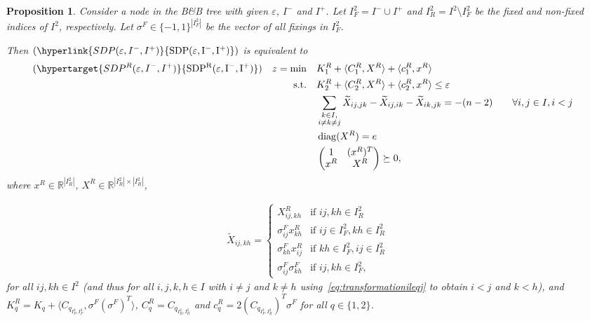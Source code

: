 \documentclass{article}
\newcommand{\mytag}[1]{(\hypertarget{#1}{\mathrm{#1}})}
\newcommand{\myrefmath}[1]{(\hyperlink{#1}{\mathrm{#1}})}
\DeclareMathOperator{\diag}{diag}
\newtheorem{proposition}[theorem]{Proposition}
\begin{document}
\begin{proposition}    \label{prop:red}
Consider a node in the B\&B tree with given $\varepsilon$, $I^-$ and $I^+$.
Let $I^2_F = I^- \cup I^+$ and $I^2_R = I^2\setminus I^2_F$ be the fixed and non-fixed indices of $I^2$, respectively. 
Let $\sigma^F \in \{-1,1\}^{|I^2_F|}$ be the vector of all fixings in $I^2_F$. 

Then $\myrefmath{SDP(\varepsilon,I^-,I^+)}$ is equivalent to 
\begin{subequations}
    \begin{align}
        \mytag{SDP^R(\varepsilon,I^-,I^+)} \quad z = \min \quad &K_1^R +\langle C_1^R,X^R \rangle + \langle c_1^R, x^R \rangle \label{eq:SDPR-obj}\\
        \text{s.t.} \quad & K_2^R + \langle C_2^R, X^R \rangle + \langle c_2^R, x^R \rangle \leq \varepsilon \label{eq:SDPR-eps} \\ 
         & \sum_{\substack{k \in I, \\ i \neq k \neq j}} \widetilde{X}_{ij,jk} - \widetilde{X}_{ij,ik} - \widetilde{X}_{ik,jk} = -(n-2) &\quad&  \label{eq:SDPR-3Cycle}
         \forall i, j \in I, i < j \\
                            & \diag(X^R) = e \label{eq:SDPR-diag} \\
                            & \begin{pmatrix}
                                1 & (x^R)^T \\
                                x^R & X^R
                            \end{pmatrix}\succeq 0 \label{eq:SDPR-psd},
    \end{align}
\end{subequations}
where $x^R \in \mathbb R^{|I^2_R|}$, $X^R \in \mathbb R^{|I^2_R|\times|I^2_R|}$, 

\begin{align} \label{eq:fixingImplications}
\widetilde{X}_{ij,kh} = 
    \begin{cases}
        X^R_{ij,kh} & \text{if } ij,kh \in I^2_R \\
        \sigma^F_{ij}x^R_{kh} & \text{if } ij \in I^2_F, kh \in I^2_R\\        
        \sigma^F_{kh}x^R_{ij} & \text{if } kh \in I^2_F, ij \in I^2_R\\
        \sigma^F_{ij}\sigma^F_{kh} & \text{if } ij,kh \in I^2_F,
    \end{cases}
\end{align}
for all $ij, kh \in I^2$ (and thus for all $i,j,k,h \in I$ with $i\neq j$ and $k \neq h$ using~\eqref{eq:transformationileqj} to obtain $i<j$ and $k<h$), 
and $K_q^R = K_q + \langle C_{q_{I^2_F, I^2_F}}, \sigma^F(\sigma^F)^T \rangle$, $C_q^R = C_{q_{I^2_R, I^2_R}}$ and $c_q^R = 2(C_{q_{I^2_F,I^2_R}})^T \sigma^F$ for all $q\in \{1,2\}$. 
\end{proposition}
\end{document}
